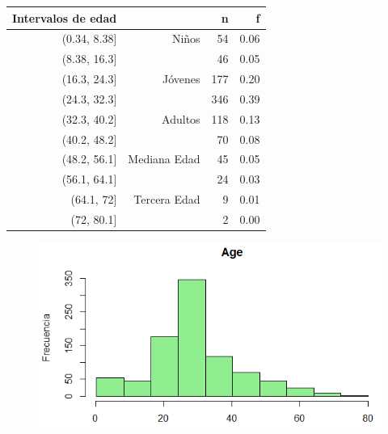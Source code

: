 \documentclass{article}
\begin{document}
\begin{table}[ht]
\centering
\begin{tabular}{rrrr}
  \hline
  Intervalos de edad & & n & f \\ 
  \hline
(0.34, 8.38] & Niños & 54 & 0.06 \\ 
  (8.38, 16.3] &   & 46 & 0.05\\ 
  (16.3, 24.3] & Jóvenes & 177& 0.20\\ 
  (24.3, 32.3] &  & 346&0.39 \\ 
  (32.3, 40.2] & Adultos &118& 0.13\\ 
  (40.2, 48.2] &  &70& 0.08\\ 
  (48.2, 56.1] & Mediana Edad &45&0.05 \\ 
  (56.1, 64.1] &  &24& 0.03\\ 
  (64.1, 72] &  Tercera Edad &9& 0.01 \\ 
  (72, 80.1] &   &2& 0.00\\ 
   \hline
\end{tabular}
\end{table}

\begin{figure}[!h]
    \centering
    \includegraphics[width=0.7\linewidth]{content/hist_age.png}
\end{figure}
\end{document}
